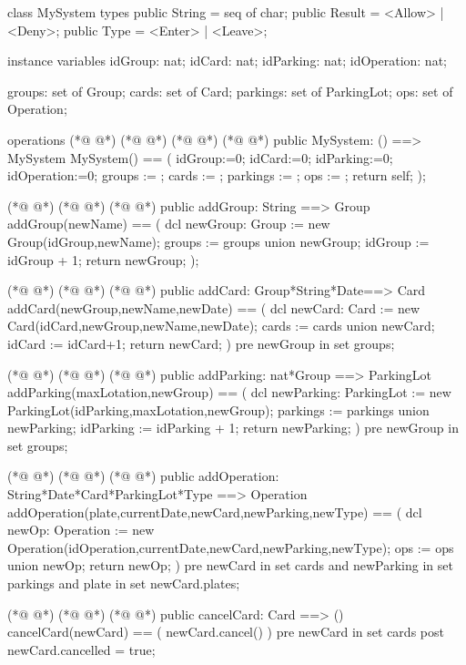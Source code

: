 \begin{vdmpp}[breaklines=true]
class MySystem
types
public String = seq of char;
public Result = <Allow> | <Deny>;
public Type = <Enter> | <Leave>;

instance variables
idGroup: nat;
idCard: nat;
idParking: nat;
idOperation: nat;

groups: set of Group;
cards: set of Card;
parkings: set of ParkingLot;
ops: set of Operation;

operations
(*@
\label{MySystem:19}
@*)
(*@
\label{System:19}
@*)
(*@
\label{MySystem:19}
@*)
(*@
\label{System:19}
@*)
public MySystem: () ==> MySystem
 MySystem() == (
  idGroup:=0;
  idCard:=0;
  idParking:=0;
  idOperation:=0;
  groups := {};
  cards := {};
  parkings := {};
  ops := {};
  return self;
 );
 
(*@
\label{addGroup:32}
@*)
(*@
\label{addGroup:32}
@*)
(*@
\label{addGroup:32}
@*)
public addGroup: String ==> Group
 addGroup(newName) == (
  dcl newGroup: Group := new Group(idGroup,newName);
  groups := groups union {newGroup};
  idGroup := idGroup + 1;
  return newGroup;
 );
 
(*@
\label{addCard:40}
@*)
(*@
\label{addCard:40}
@*)
(*@
\label{addCard:40}
@*)
public addCard: Group*String*Date==> Card
 addCard(newGroup,newName,newDate) == (
  dcl newCard: Card := new Card(idCard,newGroup,newName,newDate);
  cards := cards union {newCard};
  idCard := idCard+1;
  return newCard;
 )
 pre newGroup in set groups;
 
(*@
\label{addParking:49}
@*)
(*@
\label{addParking:49}
@*)
(*@
\label{addParking:49}
@*)
public addParking: nat*Group ==> ParkingLot
 addParking(maxLotation,newGroup) == (
  dcl newParking: ParkingLot := new ParkingLot(idParking,maxLotation,newGroup);
  parkings := parkings union {newParking};
  idParking := idParking + 1;
  return newParking;
 )
 pre newGroup in set groups;
 
(*@
\label{addOperation:58}
@*)
(*@
\label{addOperation:58}
@*)
(*@
\label{addOperation:58}
@*)
public addOperation: String*Date*Card*ParkingLot*Type ==> Operation
 addOperation(plate,currentDate,newCard,newParking,newType) == (
  dcl newOp: Operation := new Operation(idOperation,currentDate,newCard,newParking,newType);
  ops := ops union {newOp};
  return newOp;
 )
 pre newCard in set cards and newParking in set parkings and plate in set newCard.plates;
 
(*@
\label{cancelCard:66}
@*)
(*@
\label{cancelCard:66}
@*)
(*@
\label{cancelCard:66}
@*)
public cancelCard: Card ==> ()
 cancelCard(newCard) == (
  newCard.cancel()
 )
 pre newCard in set cards
 post newCard.cancelled = true;


\end{vdmpp}
